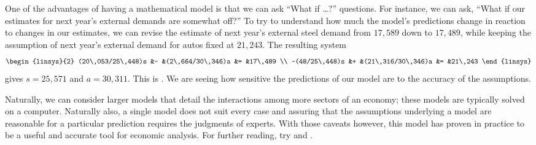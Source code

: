 One of the advantages of having a mathematical model is that we can
ask ``What if \ldots?'' questions.
For instance, we can ask,
``What if our estimates for next year's external demands are somewhat off?''
To try to understand how much the model's predictions change in 
reaction to changes in our estimates, we can revise the estimate of
next year's external steel demand from $17,589$ down to
$17,489$, while keeping the assumption of next year's external demand for
autos fixed at $21,243$. 
The resulting system
\begin{equation*}
  \begin{linsys}{2}
        (20\,053/25\,448)s &- &(2\,664/30\,346)a &= &17\,489 \\ 
      -(48/25\,448)s      &+ &(21\,316/30\,346)a &= &21\,243 
  \end{linsys}
\end{equation*}
gives $s=25,571$ and $a=30,311$.
This is .
We are seeing how sensitive the predictions of our model are to the 
accuracy of the assumptions.

Naturally, we can consider larger models that detail the interactions 
among more sectors of an economy;
these models are typically solved on a computer.
Naturally also, a single model does not suit every case and 
assuring that the assumptions underlying a model
are reasonable for a particular prediction requires the judgments of experts.
With those caveats
however, this model has proven in practice to be a useful and accurate tool for
economic analysis.
For further reading, try \cite{Leontief1951} and \cite{Leontief1965}. 


